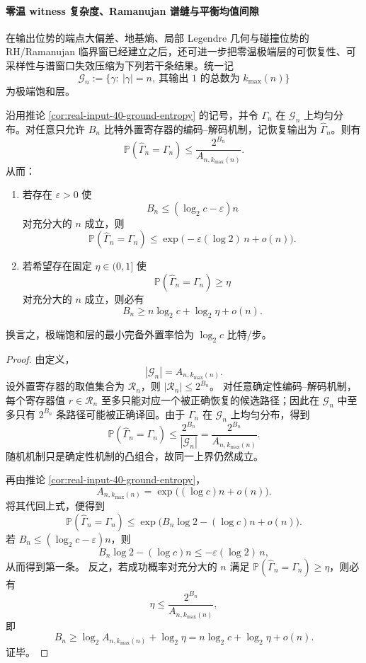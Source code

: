 \paragraph{零温 witness 复杂度、Ramanujan 谱缝与平衡均值间隙}
在输出位势的端点大偏差、地基熵、局部 Legendre 几何与碰撞位势的 RH/Ramanujan 临界窗已经建立之后，还可进一步把零温极端层的可恢复性、可采样性与谱窗口失效压缩为下列若干条结果。统一记
\[
\mathcal G_n:=
\{\gamma:\ |\gamma|=n,\ \text{其输出 }1\text{ 的总数为 }k_{\max}(n)\}
\]
为极端饱和层。

\begin{theorem}\label{thm:xi-real-input-ground-layer-oracle-threshold}
沿用推论 \ref{cor:real-input-40-ground-entropy} 的记号，并令 \(\Gamma_n\) 在 \(\mathcal G_n\) 上均匀分布。对任意只允许 \(B_n\) 比特外置寄存器的编码--解码机制，记恢复输出为 \(\widehat\Gamma_n\)。则有
\[
\boxed{\;
\mathbb P(\widehat\Gamma_n=\Gamma_n)
\le
\frac{2^{B_n}}{A_{n,k_{\max}(n)}}.
\;}
\]
从而：
\begin{enumerate}
  \item 若存在 \(\varepsilon>0\) 使
  \[
  B_n\le (\log_2 c-\varepsilon)n
  \]
  对充分大的 \(n\) 成立，则
  \[
  \mathbb P(\widehat\Gamma_n=\Gamma_n)
  \le
  \exp\!\bigl(-\varepsilon(\log 2)\,n+o(n)\bigr).
  \]
  \item 若希望存在固定 \(\eta\in(0,1]\) 使
  \[
  \mathbb P(\widehat\Gamma_n=\Gamma_n)\ge \eta
  \]
  对充分大的 \(n\) 成立，则必有
  \[
  B_n\ge n\log_2 c+\log_2\eta+o(n).
  \]
\end{enumerate}
换言之，极端饱和层的最小完备外置率恰为 \(\log_2 c\) 比特/步。
\end{theorem}
\begin{proof}
由定义，
\[
|\mathcal G_n|=A_{n,k_{\max}(n)}.
\]
设外置寄存器的取值集合为 \(\mathcal R_n\)，则
\(
|\mathcal R_n|\le 2^{B_n}
\)。
对任意确定性编码--解码机制，每个寄存器值 \(r\in\mathcal R_n\) 至多只能对应一个被正确恢复的候选路径；因此在 \(\mathcal G_n\) 中至多只有 \(2^{B_n}\) 条路径可能被正确译回。由于 \(\Gamma_n\) 在 \(\mathcal G_n\) 上均匀分布，得到
\[
\mathbb P(\widehat\Gamma_n=\Gamma_n)\le \frac{2^{B_n}}{|\mathcal G_n|}
=\frac{2^{B_n}}{A_{n,k_{\max}(n)}}.
\]
随机机制只是确定性机制的凸组合，故同一上界仍然成立。

再由推论 \ref{cor:real-input-40-ground-entropy}，
\[
A_{n,k_{\max}(n)}=\exp\bigl((\log c)n+o(n)\bigr).
\]
将其代回上式，便得到
\[
\mathbb P(\widehat\Gamma_n=\Gamma_n)
\le
\exp\bigl(B_n\log 2-(\log c)n+o(n)\bigr).
\]
若 \(B_n\le (\log_2 c-\varepsilon)n\)，则
\[
B_n\log 2-(\log c)n\le -\varepsilon(\log 2)\,n,
\]
从而得到第一条。
反之，若成功概率对充分大的 \(n\) 满足
\(
\mathbb P(\widehat\Gamma_n=\Gamma_n)\ge \eta
\)，则必有
\[
\eta
\le
\frac{2^{B_n}}{A_{n,k_{\max}(n)}},
\]
即
\[
B_n\ge \log_2 A_{n,k_{\max}(n)}+\log_2\eta
=n\log_2 c+\log_2\eta+o(n).
\]
证毕。
\end{proof}

